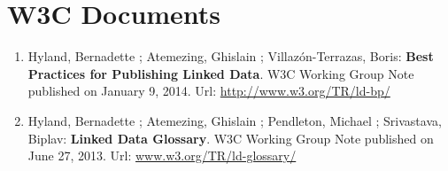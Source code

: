 \section*{W3C Documents}
\label{sec:w3cdocs}
\begin{enumerate}
\item {H}yland, {B}ernadette ; {A}temezing, {G}hislain ; {V}illaz{\'o}n-{T}errazas, {B}oris: \textbf{Best Practices for Publishing Linked Data}. W3C Working Group Note published on January 9, 2014. Url: \url{http://www.w3.org/TR/ld-bp/}

\item {H}yland, {B}ernadette ; {A}temezing, {G}hislain ;  {P}endleton, {M}ichael ; {S}rivastava, {B}iplav: \textbf{Linked Data Glossary}. W3C Working Group Note published on June 27, 2013. Url: \url{www.w3.org/TR/ld-glossary/}

\end{enumerate}